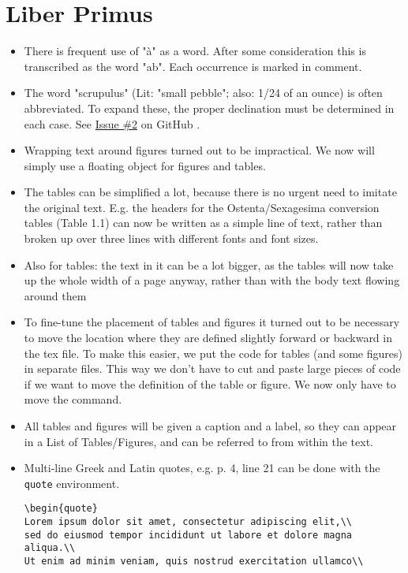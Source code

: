 \documentclass{report}
\newcommand{\SeeIssue}[1]{%
See \textcolor{blue}{%
\href{https://github.com/DomoViridi/Scaliger/issues/#1}%
{Issue \#{#1}}%
} on GitHub%
}
\begin{document}
\section{Liber Primus}
\begin{itemize}
\item
There is frequent use of "à" as a word. After some consideration this
is transcribed as the word "ab". Each occurrence is marked in comment.
\item
The word "scrupulus" (Lit: "small pebble"; also: 1/24 of an ounce)
is often abbreviated. To expand these, the proper
declination must be determined in each case. \SeeIssue{2}.
\item
Wrapping text around figures turned out to be impractical. We now will
simply use a floating object for figures and tables.
\item
The tables can be simplified
a lot, because there is no urgent need to imitate the original text.
E.g. the headers
for the Ostenta/Sexagesima conversion tables (Table 1.1) can now be written
as a simple line of text,
rather than broken up over three lines with different
fonts and font sizes.
\item
Also for tables: the text in it can be a lot bigger, as the tables
will now take up the whole width of a page anyway,
rather than with the body text flowing around them
\item
To fine-tune the placement of tables and figures it turned out to be
necessary to move the location where they are defined slightly forward or
backward in the tex file. To make this easier, we put the code for tables
 (and some figures) in separate files.
This way we don't have to cut and paste large pieces of code if we want to
move the definition of the table or figure. We now only have to move the
\verb++ command.
\item
All tables and figures will be given a caption and a label, so they can
appear in a List of Tables/Figures, and can be referred to from within the
text.
\item
Multi-line Greek and Latin quotes, e.g. p. 4, line 21
can be done with the \verb+quote+ environment.
\begin{verbatim}
\begin{quote}
Lorem ipsum dolor sit amet, consectetur adipiscing elit,\\
sed do eiusmod tempor incididunt ut labore et dolore magna aliqua.\\
Ut enim ad minim veniam, quis nostrud exercitation ullamco\\

\end{verbatim}
\end{itemize}
\end{document}
